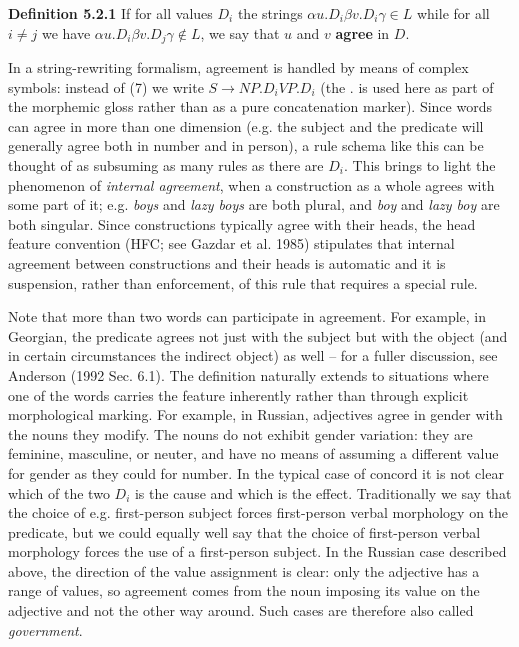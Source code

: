 \smallskip
\noindent
{\bf Definition 5.2.1} If for all values $D_i$ the strings $\alpha u.D_i \beta
v.D_i \gamma \in L$ while for all $i \neq j$ we have $\alpha u.D_i \beta v.D_j
\gamma \not\in L$, we say that $u$ and $v$ {\bf agree} in $D$. 

\smallskip
\noindent
In a string-rewriting formalism, agreement is handled by means of complex
symbols: instead of (7) we write $S \rightarrow NP.D_i VP.D_i$ (the . is used
here as part of the morphemic gloss rather than as a pure concatenation
marker). Since words can agree in more than one dimension (e.g. the subject
and the predicate will generally agree both in number and in person), a rule
schema like this can be thought of as subsuming as many rules as there are
$D_i$. This brings to light the phenomenon of {\it internal agreement}, when a
construction as a whole agrees with some part of it; e.g. {\it boys} and {\it
  lazy boys} are both plural, and {\it boy} and {\it lazy boy} are both
singular.  Since constructions typically agree with their heads, the head
feature convention (HFC; see Gazdar et al. 1985) \nocite{Gazdar:1985}
 stipulates that internal agreement
between constructions and their heads is automatic and it is suspension,
rather than enforcement, of this rule that requires a special rule.

Note that more than two words can participate in agreement. For example, in
Georgian, the predicate agrees not just with the subject but with the object
(and in certain circumstances the indirect object) as well -- for a fuller
discussion, see Anderson (1992 Sec. 6.1). The definition naturally extends to
situations where one of the words carries the feature inherently rather than
through explicit morphological marking. For example, in Russian, adjectives
agree in gender with the nouns they modify. The nouns do not exhibit gender
variation: they are feminine, masculine, or neuter, and have no means of
assuming a different value for gender as they could for number. In the typical
case of concord it is not clear which of the two $D_i$ is the cause and which
is the effect. Traditionally we say that the choice of e.g.  first-person
subject forces first-person verbal morphology on the predicate, but we could
equally well say that the choice of first-person verbal morphology forces the
use of a first-person subject. In the Russian case described above, the
direction of the value assignment is clear: only the adjective has a range of
values, so agreement comes from the noun imposing its value on the adjective
and not the other way around. Such cases are therefore also called {\it
government}. 


